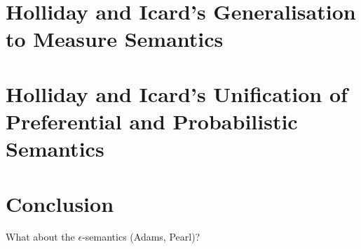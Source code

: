 \documentclass{article}
\theoremstyle{definition}
\begin{document}
\section{Holliday and Icard's Generalisation to Measure Semantics}
\section{Holliday and Icard's Unification of Preferential and Probabilistic Semantics}
\section{Conclusion}
What about the $\epsilon$-semantics (Adams, Pearl)? 
\nocite{hamblin59_modal_probab,holliday13_measur,harrison-trainor17_prefer,kratzer91_modal,lassiter10_gradab,yalcin10_probab_operat,kratzer98_seman}
 \printbibliography
\end{document}
